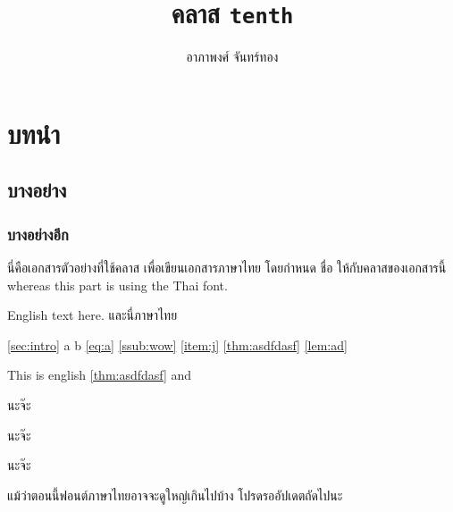 \usepackage{lipsum}
\title{คลาส \texttt{tenth}}
\author{อาภาพงศ์ จันทร์ทอง}

\newrobustcmd{\codehl}{\texttt}


    \maketitle

    \section{บทนำ \label{sec:intro}}
    \subsection{บางอย่าง}
    \subsubsection{บางอย่างอีก \label{ssub:wow}}

    นี่คือเอกสารตัวอย่างที่ใช้คลาส  เพื่อเขียนเอกสารภาษาไทย โดยกำหนด  ชื่อ  ให้กับคลาสของเอกสารนี้  whereas this part is using the Thai font.

    \begin{eng}
        English text here. {\tha และนี่ภาษาไทย}
    \end{eng}

    \autoref{sec:intro} a \sectionautorefname{} b \autoref{eq:a} \autoref{ssub:wow} \autoref{item:j}
    \Hfootnoteautorefname{} \AMSautorefname{} \autoref{thm:asdfdasf} \autoref{lem:ad} \lemmaautorefname{}

    { This is english \autoref{thm:asdfdasf} and \chaptername}

    \begin{theorem}
        \label{thm:asdfdasf}
        นะจ๊ะ
    \end{theorem}
    \unskip
    \begin{lemma}
        \label{lem:ad}
        นะจ๊ะ
    \end{lemma}

    \begin{remark}
        นะจ๊ะ
    \end{remark}

    แม้ว่าตอนนี้ฟอนต์ภาษาไทยอาจจะดูใหญ่เกินไปบ้าง โปรดรออัปเดตถัดไปนะ

